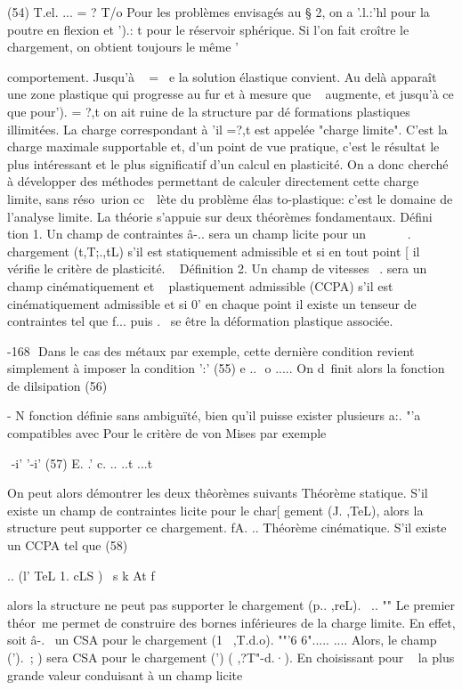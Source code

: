 {{(54)  T.el. ...  =  ? T/o  
Pour les problèmes envisagés  au  §  2,  on  a  '.l.:'hl  pour  la  poutre  en  flexion  
et ').: t  pour le réservoir sphérique.  
Si  l'on fait croître le chargement,  on  obtient  toujours  le même  
' 

comportement. Jusqu'à ~ = ~e la solution élastique convient. Au delà 
apparaît une zone plastique qui progresse au fur et à mesure que ~ aug­mente, et jusqu'à ce que pour'). = ?,t on ait ruine de la structure par dé­
formations plastiques illimitées. 
La charge correspondant à 'il =?,t est appelée "charge limite". C'est la charge maximale supportable et, d'un point de vue pratique, c'est le résultat le plus intéressant et le plus significatif d'un calcul en plas­ticité. On a donc cherché à développer des méthodes permettant de calculer 
directement cette charge limite, sans réso~urion cc~~lète du problème élas­
to-plastique: c'est le domaine de l'analyse limite. 
La théorie s'appuie sur deux théorèmes fondamentaux. 
Défini tion 1. Un champ de contraintes â-.. sera un champ licite pour un 
~~~~~~. ~~ 
chargement (t,T;.,tL) s'il est statiquement admissible et si en tout point 
[ 
il vérifie le critère de plasticité. 
~ 
Définition 2. Un champ de vitesses ~. sera un champ cinématiquement et 
~ 
plastiquement admissible (CCPA) s'il est cinématiquement admissible et si 
0' 
en  chaque point  il existe  un  tenseur  de  contraintes  tel que f... puis­ 
.~  
se  être la déformation plastique associée.  

-168 ­
Dans le cas des métaux par exemple, cette dernière condition re­vient simplement à imposer la condition 
':' 
(55) e ..  o 
..... 
On d~finit alors la fonction de dilsipation 
(56) 

-
N
fonction définie sans ambiguïté, bien qu'il puisse exister plusieurs a:. 
"'a
compatibles avec Pour le critère de von Mises par exemple 

 -i' '-i'
(57) 
E. .' c. .. 
..t ...t 

On peut alors démontrer les deux thêorèmes suivants 
Théorème statique. S'il existe un champ de contraintes licite pour le char­[ gement (J. ,TeL), alors la structure peut supporter ce chargement.
fA. .. 
Théorème cinématique. S'il existe un CCPA tel que 
(58) 

.. (l' TeL 1. cLS )
~s k At 
f 

alors la structure ne peut pas supporter le chargement (p.. ,reL). 
~.. "" 
Le premier théor~me permet de construire des bornes inférieures de la charge limite. En effet, soit â-.~ un CSA pour le chargement (1~ ,T.d.o).
""'6 6"..... .... 
Alors, le champ (').~; ) sera CSA pour le chargement (') ( ,?T"-d.·). En choisissant pour ~ la plus grande valeur conduisant à un champ licite 

}}
